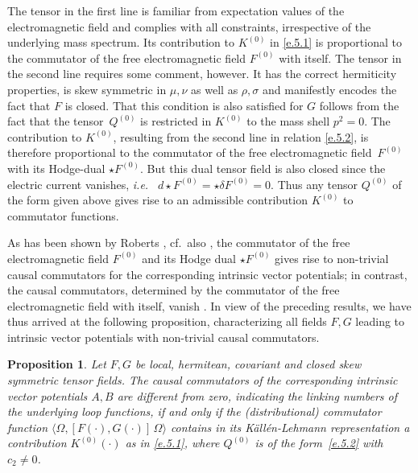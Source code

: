 \documentclass[11pt]{article}
\newtheorem{proposition}[theorem]{Proposition}
\numberwithin{equation}{section}
\def\ie{{\it i.e.\ }}
\begin{document}
\medskip 
The tensor in 
the first line is familiar from expectation values of the 
electromagnetic field and complies with all
constraints, irrespective of the underlying mass spectrum.
Its contribution to $K^{(0)}$ in \eqref{e.5.1} is 
proportional  to the commutator of the free electromagnetic field
$F^{(0)}$ with itself. The tensor in the second line
requires some comment, however. It has the correct hermiticity properties,
is skew symmetric in $\mu, \nu$ as well as $\rho, \sigma$ and manifestly
encodes the fact that $F$ is closed. That this condition 
is also satisfied 
for $G$ follows from the fact that the tensor~$Q^{(0)}$ 
is restricted in $K^{(0)}$ to the mass shell $p^2 = 0$. 
The contribution to $K^{(0)}$, resulting from the 
second line in relation \eqref{e.5.2},  is therefore 
proportional to the commutator of the free 
electromagnetic field~$F^{(0)}$ with its Hodge-dual 
$\star F^{(0)}$. But this dual tensor field is also closed
since the electric current vanishes, \ie 
$d \star F^{(0)} = \star \delta  F^{(0)} = 0$.  
Thus any tensor $Q^{(0)}$ of the form given above 
gives rise to an admissible contribution $K^{(0)}$ 
to commutator functions.

\medskip
As has been shown by Roberts \cite{Roberts}, cf.\ also \cite{BuCiRuVa2}, 
the commutator of the free electromagnetic 
field $F^{(0)}$ and its Hodge dual $\star F^{(0)}$ 
gives rise to non-trivial causal commutators for 
the corresponding intrinsic vector potentials; in contrast,  
the causal commutators, determined by the 
commutator of the free electromagnetic
field with itself, vanish \cite{BuCiRuVa2}. In view of the 
preceding results, we have thus arrived at the following 
proposition, characterizing all fields $F,G$
leading to intrinsic vector potentials with non-trivial 
causal commutators. 

\begin{proposition}
\label{prop.5.1}
Let $F,G$ be local, hermitean, covariant and 
closed skew symmetric tensor fields. The causal commutators of the
corresponding intrinsic vector potentials $A,B$ are different from zero, 
indicating the linking numbers of the underlying loop functions, 
if and only if the (distributional) commutator function 
$ \langle \Omega, [F( \cdot ), G( \cdot ) ] \, \Omega \rangle $
contains in its K\"all\'en-Lehmann representation a contribution
$K^{(0)}(\cdot)$ as in \eqref{e.5.1}, where $Q^{(0)}$ is of 
the form~\eqref{e.5.2} with $c_2 \neq 0$. 
\end{proposition}
\end{document}
